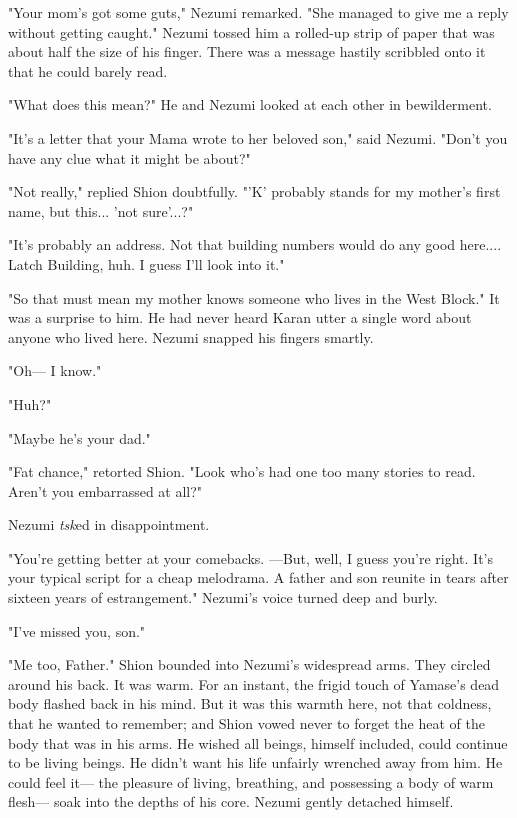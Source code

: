 "Your mom's got some guts," Nezumi remarked. "She managed to give me a
reply without getting caught." Nezumi tossed him a rolled-up strip of
paper that was about half the size of his finger. There was a message
hastily scribbled onto it that he could barely read.


"What does this mean?" He and Nezumi looked at each other in
bewilderment.

"It's a letter that your Mama wrote to her beloved son," said Nezumi.
"Don't you have any clue what it might be about?"

"Not really," replied Shion doubtfully. "'K' probably stands for my
mother's first name, but this... 'not sure'...?"

"It's probably an address. Not that building numbers would do any good
here.... Latch Building, huh. I guess I'll look into it."

"So that must mean my mother knows someone who lives in the West Block."
It was a surprise to him. He had never heard Karan utter a single word
about anyone who lived here. Nezumi snapped his fingers smartly.

"Oh--- I know."

"Huh?"

"Maybe he's your dad."

"Fat chance," retorted Shion. "Look who's had one too many stories to
read. Aren't you embarrassed at all?"

Nezumi \emph{tsk}ed in disappointment.

"You're getting better at your comebacks. ---But, well, I guess you're
right. It's your typical script for a cheap melodrama. A father and son
reunite in tears after sixteen years of estrangement." Nezumi's voice
turned deep and burly.

"I've missed you, son."

"Me too, Father." Shion bounded into Nezumi's widespread arms. They
circled around his back. It was warm. For an instant, the frigid touch
of Yamase's dead body flashed back in his mind. But it was this warmth
here, not that coldness, that he wanted to remember; and Shion vowed
never to forget the heat of the body that was in his arms. He wished all
beings, himself included, could continue to be living beings. He didn't
want his life unfairly wrenched away from him. He could feel it--- the
pleasure of living, breathing, and possessing a body of warm flesh--- soak
into the depths of his core. Nezumi gently detached himself.

